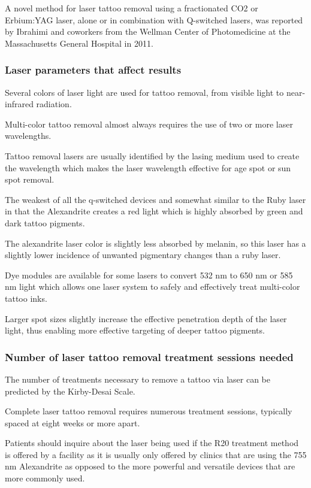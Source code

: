 \documentclass[12pt]{article}
\begin{document}
A novel method for laser tattoo removal using a fractionated CO2 or Erbium:YAG laser, alone or in combination with Q-switched lasers, was reported by Ibrahimi and coworkers from the Wellman Center of Photomedicine at the Massachusetts General Hospital in 2011.

\subsubsection{Laser parameters that affect results}
Several colors of laser light are used for tattoo removal, from visible light to near-infrared radiation.

Multi-color tattoo removal almost always requires the use of two or more laser wavelengths.

Tattoo removal lasers are usually identified by the lasing medium used to create the wavelength which makes the laser wavelength effective for age spot or sun spot removal.

The weakest of all the q-switched devices and somewhat similar to the Ruby laser in that the Alexandrite creates a red light which is highly absorbed by green and dark tattoo pigments.

The alexandrite laser color is slightly less absorbed by melanin, so this laser has a slightly lower incidence of unwanted pigmentary changes than a ruby laser.

Dye modules are available for some lasers to convert 532 nm to 650 nm or 585 nm light which allows one laser system to safely and effectively treat multi-color tattoo inks.

Larger spot sizes slightly increase the effective penetration depth of the laser light, thus enabling more effective targeting of deeper tattoo pigments.

\subsubsection{Number of laser tattoo removal treatment sessions needed}
The number of treatments necessary to remove a tattoo via laser can be predicted by the Kirby-Desai Scale.

Complete laser tattoo removal requires numerous treatment sessions, typically spaced at eight weeks or more apart.

Patients should inquire about the laser being used if the R20 treatment method is offered by a facility as it is usually only offered by clinics that are using the 755 nm Alexandrite as opposed to the more powerful and versatile devices that are more commonly used.
\end{document}
